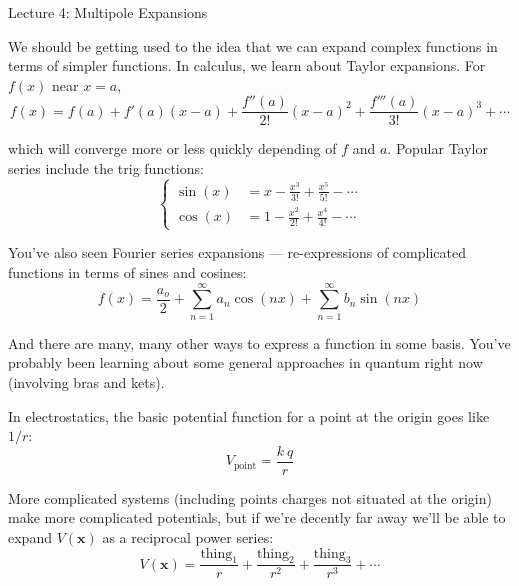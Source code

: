 \documentclass{article}
\begin{document}
\begin{center}
    {\Huge Lecture 4: Multipole Expansions} \\[0.5cm]
\end{center}

\vspace{1em}

We should be getting used to the idea that we can expand complex functions in terms of simpler functions. In calculus, we learn about Taylor expansions. For $f(x)$ near $x=a$,
\begin{equation*}
    f(x) = f(a) + f'(a) (x-a) + \frac{f''(a)}{2!} (x-a)^2 + \frac{f'''(a)}{3!} (x-a)^3 + \cdots
\end{equation*}

which will converge more or less quickly depending of $f$ and $a$. Popular Taylor series include the trig functions:
\begin{equation*}
    \begin{cases} \sin{(x)} &= x - \frac{x^3}{3!} + \frac{x^5}{5!} - \cdots \\ \cos{(x)} &= 1 - \frac{x^2}{2!} + \frac{x^4}{4!} - \cdots \end{cases}
\end{equation*}

You've also seen Fourier series expansions --- re-expressions of complicated functions in terms of sines and cosines:
\begin{equation*}
    f(x) = \frac{a_o}{2} + \sum\limits_{n=1}^{\infty} a_n \cos{(nx)} + \sum\limits_{n=1}^{\infty} b_n \sin{(nx)}
\end{equation*}

And there are many, many other ways to express a function in some basis. You've probably been learning about some general approaches in quantum right now (involving bras and kets).

\vspace{1em}

In electrostatics, the basic potential function for a point at the origin goes like $1/r$:
\begin{equation*}
    V_{\text{point}} = \frac{k\ q}{r}
\end{equation*}

More complicated systems (including points charges not situated at the origin) make more complicated potentials, but if we're decently far away we'll be able to expand $V(\bm{x})$ as a reciprocal power series:
\begin{equation*}
    V(\bm{x}) = \frac{\text{thing}_1}{r} + \frac{\text{thing}_2}{r^2} + \frac{\text{thing}_3}{r^3} + \cdots
\end{equation*}
\end{document}
